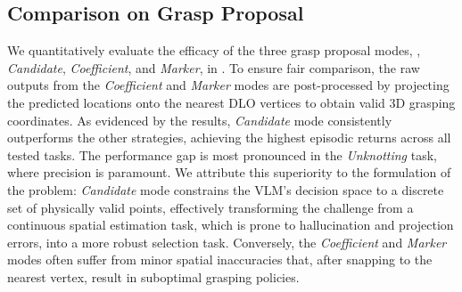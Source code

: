 \subsection{Comparison on Grasp Proposal}
\label{sec:comparison_grasp_proposal}
We quantitatively evaluate the efficacy of the three grasp proposal modes, \ie, \textit{Candidate}, \textit{Coefficient}, and \textit{Marker}, in . To ensure fair comparison, the raw outputs from the \textit{Coefficient} and \textit{Marker} modes are post-processed by projecting the predicted locations onto the nearest DLO vertices to obtain valid 3D grasping coordinates. As evidenced by the results, \textit{Candidate} mode consistently outperforms the other strategies, achieving the highest episodic returns across all tested tasks. The performance gap is most pronounced in the \textit{Unknotting} task, where precision is paramount. We attribute this superiority to the formulation of the problem: \textit{Candidate} mode constrains the VLM's decision space to a discrete set of physically valid points, effectively transforming the challenge from a continuous spatial estimation task, which is prone to hallucination and projection errors, into a more robust selection task. Conversely, the \textit{Coefficient} and \textit{Marker} modes often suffer from minor spatial inaccuracies that, after snapping to the nearest vertex, result in suboptimal grasping policies.

